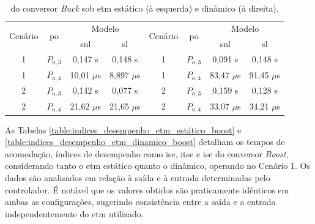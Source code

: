 \vspace{12pt}
\begin{table}[H]
  \centering
  \captionsetup{justification=centering}
  \setlength{\tabcolsep}{10pt}
  \begin{tabular}{cccccccc}
    \toprule
    \multirow{2}{*}{\centering Cenário} & \multirow{2}{*}{\centering \acrshort{po}} & \multicolumn{2}{c}{\centering Modelo} & \multirow{2}{*}{\centering Cenário} & \multirow{2}{*}{\centering \acrshort{po}} & \multicolumn{2}{c}{\centering Modelo}                     \\
    \cmidrule(lr){3-4} \cmidrule(lr){7-8}                      &                                           & \acrshort{snl}                                    & \acrshort{sl}                                   &                                           &                                       & \acrshort{snl}      & \acrshort{sl}       \\
    \midrule
    1  & $P_{\mathrm{o}, 3}$                                  & 0,147 s                               & 0,148 s      &
    1   & $P_{\mathrm{o}, 3}$                                 & 0,091 s                               & 0,148 s      \\
    1  & $P_{\mathrm{o}, 4}$                                  & 10,01 $\mu$s                    & 8,897 $\mu$s & 
    1   & $P_{\mathrm{o}, 4}$                                 & 83,47 $\mu$s                          & 91,45 $\mu$s \\
    2  & $P_{\mathrm{o}, 3}$                                  & 0,142 s                               & 0,077 s      &
    2   & $P_{\mathrm{o}, 3}$                                 & 0,159 s                               & 0,128 s      \\
    2   & $P_{\mathrm{o}, 4}$                                 & 21,62 $\mu$s                          & 21,65 $\mu$s &
      2 & $P_{\mathrm{o}, 4}$                                    & 33,07 $\mu$s                          & 34,21 $\mu$s \\
    \bottomrule
  \end{tabular}
  \caption{ do conversor \textit{Buck} sob \acrshort{etm} estático (à esquerda) e dinâmico (à direita).}
  \label{table:imees_boost_static_dynamic}
\end{table}

As Tabelas \ref{table:indices_desempenho_etm_estático_boost} e \ref{table:indices_desempenho_etm_dinamico_boost} detalham os tempos de acomodação, índices de desempenho como \acrshort{ise}, \acrshort{itse} e \acrshort{isc} do conversor \textit{Boost}, considerando tanto o \acrshort{etm} estático quanto o dinâmico, operando no Cenário 1. Os dados são analisados em relação à saída e à entrada determinadas pelo controlador. É notável que os valores obtidos são praticamente idênticos em ambas as configurações, sugerindo consistência entre a saída e a entrada independentemente do \acrshort{etm} utilizado. 

